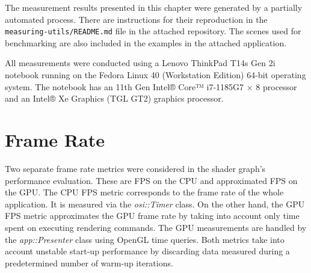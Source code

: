 \documentclass[
  digital,     %
  oneside,     %
  nosansbold,  %
  nocolorbold, %
  lof,         %
  lot,         %
]{fithesis4}
\begin{document}
The measurement results presented in this chapter were generated by a partially automated
process. There are instructions for their reproduction in the \verb|measuring-utils/README.md|
file in the attached repository. The scenes used for benchmarking are also included in the
examples in the attached application.

All measurements were conducted using a Lenovo ThinkPad T14s Gen 2i notebook running on
the Fedora Linux 40 (Workstation Edition) 64-bit operating system.
The notebook has an 11th Gen Intel® Core™ i7-1185G7 × 8 processor and an Intel® Xe Graphics (TGL GT2)
graphics processor.

\section{Frame Rate}
Two separate frame rate metrics were considered in the shader graph's performance
evaluation. These are FPS on the CPU and approximated FPS on the GPU.
The CPU FPS metric corresponds to the frame rate of the whole application.
It is measured via the \textit{osi::Timer} class.
On the other hand, the GPU FPS metric approximates the GPU frame rate by taking into account only time
spent on executing rendering commands. The GPU measurements are handled by the \textit{app::Presenter} class
using OpenGL time queries. Both metrics take into account unstable start-up performance by discarding
data measured during a predetermined number of warm-up iterations.
\end{document}
